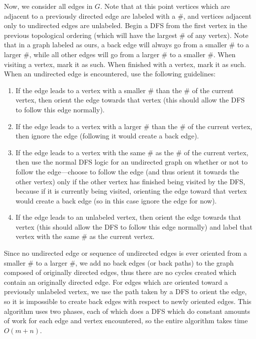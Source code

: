 \documentclass{article}
\begin{document}
\begin{enumerate}
\begin{enumerate}
\par Now, we consider all edges in $G$.  Note that at this point vertices which are adjacent to a previously directed edge are labeled with a $\#$, and vertices adjacent only to undirected edges are unlabeled.  Begin a DFS from the first vertex in the previous topological ordering (which will have the largest $\#$ of any vertex). Note that in a graph labeled as ours, a back edge will always go from a smaller $\#$ to a larger $\#$, while all other edges will go from a larger $\#$ to a smaller $\#$. When visiting a vertex, mark it as such. When finished with a vertex, mark it as such. When an undirected edge is encountered, use the following guidelines:
\begin{enumerate}
	\item If the edge leads to a vertex with a smaller $\#$ than the $\#$ of the current vertex, then orient the edge towards that vertex (this should allow the DFS to follow this edge normally).
	
	\item If the edge leads to a vertex with a larger $\#$ than the $\#$ of the current vertex, then ignore the edge (following it would create a back edge).
	
	\item If the edge leads to a vertex with the same $\#$ as the $\#$ of the current vertex, then use the normal DFS logic for an undirected graph on whether or not to follow the edge---choose to follow the edge (and thus orient it towards the other vertex) only if the other vertex has finished being visited by the DFS, because if it is currently being visited, orienting the edge toward that vertex would create a back edge (so in this case ignore the edge for now).
	
	\item If the edge leads to an unlabeled vertex, then orient the edge towards that vertex (this should allow the DFS to follow this edge normally) and label that vertex with the same $\#$ as the current vertex.
\end{enumerate}

\par Since no undirected edge or sequence of undirected edges is ever oriented from a smaller $\#$ to a larger $\#$, we add no back edges (or back paths) to the graph composed of originally directed edges, thus there are no cycles created which contain an originally directed edge. For edges which are oriented toward a previously unlabeled vertex, we use the path taken by a DFS to orient the edge, so it is impossible to create back edges with respect to newly oriented edges. This algorithm uses two phases, each of which does a DFS which do constant amounts of work for each edge and vertex encountered, so the entire algorithm takes time $O(m + n)$.


\end{enumerate}
\end{enumerate}
\end{document}

